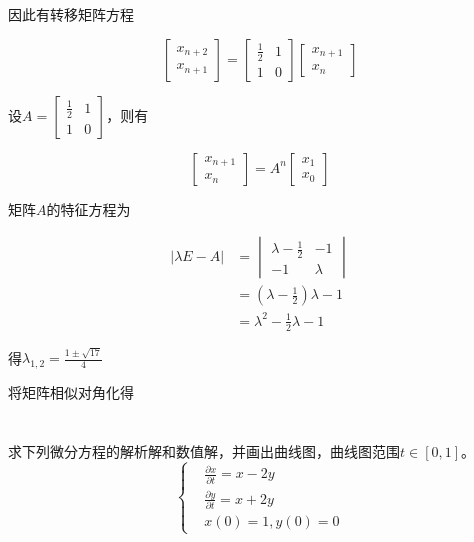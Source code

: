 因此有转移矩阵方程

\begin{equation}
    \begin{bmatrix}
        x_{n+2} \\
        x_{n+1} 
    \end{bmatrix} =
    \begin{bmatrix}
        \frac{1}{2} & 1 \\
        1 & 0 
    \end{bmatrix}
    \begin{bmatrix}
        x_{n+1} \\
        x_n
    \end{bmatrix}
\end{equation}

设$A = \begin{bmatrix}
    \frac{1}{2} & 1 \\
    1 & 0 
\end{bmatrix}$，则有

\begin{equation}
    \begin{bmatrix}
        x_{n+1} \\
        x_{n} 
    \end{bmatrix} =
    A^n
    \begin{bmatrix}
        x_{1} \\
        x_0
    \end{bmatrix}
\end{equation}

矩阵$A$的特征方程为

\begin{equation}
    \begin{split}  
   |\lambda E - A | &= 
   \begin{vmatrix}
    \lambda - \frac{1}{2} & -1 \\
    -1 & \lambda 
   \end{vmatrix}
   \\
   &=(\lambda -\frac{1}{2})\lambda - 1\\
   &= \lambda ^ 2 - \frac{1}{2} \lambda  -1
\end{split}
\end{equation}

得$\lambda_{1,2} = \frac{1 \pm \sqrt{17} }{4} $

将矩阵相似对角化得



\chapter{}


求下列微分方程的解析解和数值解，并画出曲线图，曲线图范围$t\in[0,1]$。
\begin{equation*}
    \left \{
        \begin{aligned}
            &\frac{\partial x}{\partial t} = x - 2y\\
            &\frac{\partial y}{\partial t} = x + 2y\\
            &x(0)=1, y(0) = 0
        \end{aligned}
    \right . 
\end{equation*}